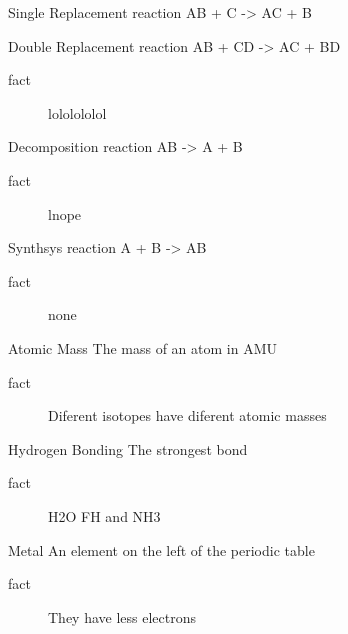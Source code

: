 \documentclass[avery5388,grid,frame]{flashcards}
\begin{document}
\begin{flashcard}[Example]{Single Replacement reaction}
  AB + C -> AC + B
\end{flashcard}

\begin{flashcard}[Definition]{Double Replacement reaction}
  AB + CD -> AC + BD
  \begin{description}
    \item[fact] lololololol
  \end{description}
\end{flashcard}

\begin{flashcard}[Definition]{Decomposition reaction}
  AB -> A + B
  \begin{description}
    \item[fact] lnope
  \end{description}
\end{flashcard}

\begin{flashcard}[Definition]{Synthsys reaction}
  A + B -> AB
  \begin{description}
    \item[fact] none
  \end{description}
\end{flashcard}

\begin{flashcard}[Definition]{Atomic Mass}
  The mass of an atom in AMU
  \begin{description}
    \item[fact] Diferent isotopes have diferent atomic masses
  \end{description}
\end{flashcard}

\begin{flashcard}[Definition]{Hydrogen Bonding}
  The strongest bond
  \begin{description}
    \item[fact] H2O FH and NH3
  \end{description}
\end{flashcard}

\begin{flashcard}[Definition]{Metal}
  An element on the left of the periodic table
  \begin{description}
    \item[fact] They have less electrons
  \end{description}
\end{flashcard}
\end{document}
